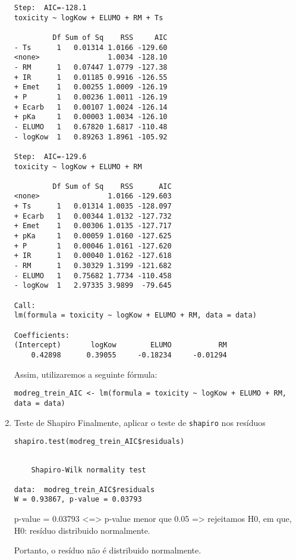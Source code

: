 \documentclass[11pt]{article}
\begin{document}
\begin{enumerate}
\begin{verbatim}
Step:  AIC=-128.1
toxicity ~ logKow + ELUMO + RM + Ts

         Df Sum of Sq    RSS     AIC
- Ts      1   0.01314 1.0166 -129.60
<none>                1.0034 -128.10
- RM      1   0.07447 1.0779 -127.38
+ IR      1   0.01185 0.9916 -126.55
+ Emet    1   0.00255 1.0009 -126.19
+ P       1   0.00236 1.0011 -126.19
+ Ecarb   1   0.00107 1.0024 -126.14
+ pKa     1   0.00003 1.0034 -126.10
- ELUMO   1   0.67820 1.6817 -110.48
- logKow  1   0.89263 1.8961 -105.92

Step:  AIC=-129.6
toxicity ~ logKow + ELUMO + RM

         Df Sum of Sq    RSS      AIC
<none>                1.0166 -129.603
+ Ts      1   0.01314 1.0035 -128.097
+ Ecarb   1   0.00344 1.0132 -127.732
+ Emet    1   0.00306 1.0135 -127.717
+ pKa     1   0.00059 1.0160 -127.625
+ P       1   0.00046 1.0161 -127.620
+ IR      1   0.00040 1.0162 -127.618
- RM      1   0.30329 1.3199 -121.682
- ELUMO   1   0.75682 1.7734 -110.458
- logKow  1   2.97335 3.9899  -79.645

Call:
lm(formula = toxicity ~ logKow + ELUMO + RM, data = data)

Coefficients:
(Intercept)       logKow        ELUMO           RM  
    0.42898      0.39055     -0.18234     -0.01294  

\end{verbatim}

Assim, utilizaremos a seguinte fórmula:
\begin{verbatim}
modreg_trein_AIC <- lm(formula = toxicity ~ logKow + ELUMO + RM, data = data)
\end{verbatim}

\item Teste de Shapiro
\label{sec:org98f65f4}
Finalmente, aplicar o teste de \texttt{shapiro} nos resíduos

\begin{verbatim}
shapiro.test(modreg_trein_AIC$residuals)
\end{verbatim}

\begin{verbatim}

	Shapiro-Wilk normality test

data:  modreg_trein_AIC$residuals
W = 0.93867, p-value = 0.03793

\end{verbatim}


p-value = 0.03793 <=> p-value menor que 0.05 => rejeitamos H0, em que, H0: resíduo distribuido normalmente.

Portanto, o resíduo não é distribuido normalmente.
\end{enumerate}
\end{document}
